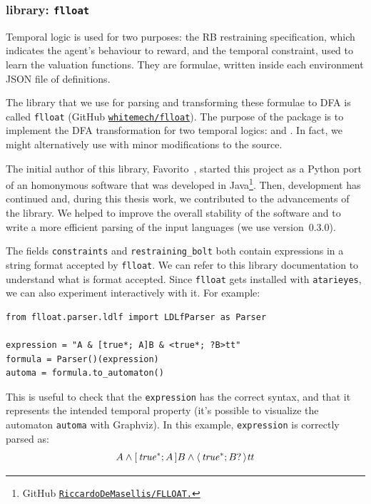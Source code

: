 \subsubsection*{\ldl{} library: \texttt{flloat}}

Temporal logic is used for two purposes: the RB restraining specification,
which indicates the agent's behaviour to reward, and the temporal constraint,
used to learn the valuation functions. They are \ldl{} formulae, written
inside each environment JSON file of definitions.

The library that we use for parsing and transforming these formulae to DFA is
called \texttt{flloat} (GitHub \href{https://github.com/whitemech/flloat}{%
\texttt{whitemech/flloat}}). The purpose of the package is to
implement the DFA transformation for two temporal logics: \ltl{} and \ldl{}.
In fact, we might alternatively use \ltl{} with minor modifications to the
source.

The initial author of this library, Favorito~\cite{bib:favorito-thesis},
started this project as a Python port of an homonymous software that was
developed in Java\footnote{GitHub
\href{https://github.com/RiccardoDeMasellis/FLLOAT}{%
\texttt{RiccardoDeMasellis/FLLOAT.}}}. Then, development has continued and,
during this thesis work, we contributed to the advancements of the
library. We helped to improve the overall stability of the software and to
write a more efficient parsing of the input languages (we use version~0.3.0).

The fields \verb|constraints| and \verb|restraining_bolt| both contain \ldl{}
expressions in a string format accepted by \texttt{flloat}.  We can refer to
this library documentation to understand what is format accepted. Since
\texttt{flloat} gets installed with \texttt{atarieyes}, we can also experiment
interactively with it.  For example:
\begin{verbatim}
from flloat.parser.ldlf import LDLfParser as Parser

expression = "A & [true*; A]B & <true*; ?B>tt"
formula = Parser()(expression)
automa = formula.to_automaton()
\end{verbatim}
This is useful to check that the \texttt{expression} has the correct syntax,
and that it represents the intended temporal property (it's possible to
visualize the automaton \texttt{automa} with Graphviz). In this example,
\texttt{expression} is correctly parsed as:
\[
	A \land [\, {\text{\textit{true}}^*; A} \,]B \land \langle\, {\text{\textit{true}}^*; B?} \,\rangle \text{\textit{tt}}
\]




